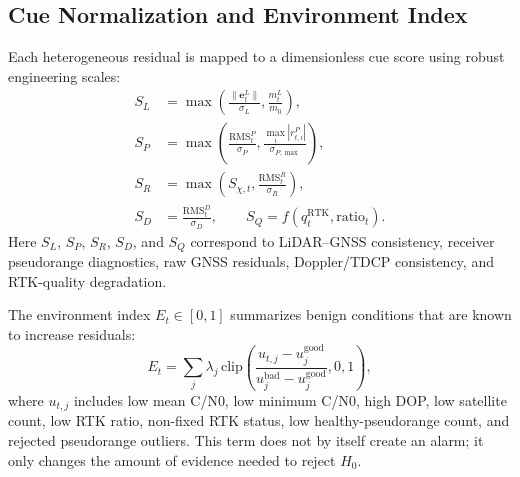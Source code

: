 \documentclass[journal]{IEEEtran}
\begin{document}
\subsection{Cue Normalization and Environment Index}
Each heterogeneous residual is mapped to a dimensionless cue score using robust engineering scales:
\begin{align}
S_L &= \max\left(\frac{\lVert \mathbf{e}^L_t\rVert}{\sigma_L}, \frac{m^L_t}{m_0}\right),\\
S_P &= \max\left(\frac{\mathrm{RMS}^P_t}{\sigma_P}, \frac{\max_i |r^P_{t,i}|}{\sigma_{P,\max}}\right),\\
S_R &= \max\left(S_{\chi,t}, \frac{\mathrm{RMS}^R_t}{\sigma_R}\right),\\
S_D &= \frac{\mathrm{RMS}^D_t}{\sigma_D}, \qquad
S_Q = f(q^{\mathrm{RTK}}_t,\mathrm{ratio}_t).
\end{align}
Here $S_L$, $S_P$, $S_R$, $S_D$, and $S_Q$ correspond to LiDAR--GNSS consistency, receiver pseudorange diagnostics, raw GNSS residuals, Doppler/TDCP consistency, and RTK-quality degradation.

The environment index $E_t\in[0,1]$ summarizes benign conditions that are known to increase residuals:
\begin{equation}
E_t =
\sum_j \lambda_j \,\mathrm{clip}\left(\frac{u_{t,j}-u^{\mathrm{good}}_j}
{u^{\mathrm{bad}}_j-u^{\mathrm{good}}_j},0,1\right),
\end{equation}
where $u_{t,j}$ includes low mean C/N0, low minimum C/N0, high DOP, low satellite count, low RTK ratio, non-fixed RTK status, low healthy-pseudorange count, and rejected pseudorange outliers.
This term does not by itself create an alarm; it only changes the amount of evidence needed to reject $H_0$.
\end{document}
